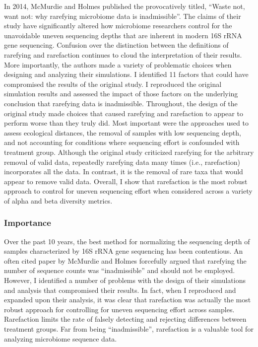 \documentclass[
]{article}
\begin{document}
In 2014, McMurdie and Holmes published the provocatively titled, ``Waste
not, want not: why rarefying microbiome data is inadmissible''. The
claims of their study have significantly altered how microbiome
researchers control for the unavoidable uneven sequencing depths that
are inherent in modern 16S rRNA gene sequencing. Confusion over the
distinction between the definitions of rarefying and rarefaction
continues to cloud the interpretation of their results. More
importantly, the authors made a variety of problematic choices when
designing and analyzing their simulations. I identified 11 factors that
could have compromised the results of the original study. I reproduced
the original simulation results and assessed the impact of those factors
on the underlying conclusion that rarefying data is inadmissible.
Throughout, the design of the original study made choices that caused
rarefying and rarefaction to appear to perform worse than they truly
did. Most important were the approaches used to assess ecological
distances, the removal of samples with low sequencing depth, and not
accounting for conditions where sequencing effort is confounded with
treatment group. Although the original study criticized rarefying for
the arbitrary removal of valid data, repeatedly rarefying data many
times (i.e., rarefaction) incorporates all the data. In contrast, it is
the removal of rare taxa that would appear to remove valid data.
Overall, I show that rarefaction is the most robust approach to control
for uneven sequencing effort when considered across a variety of alpha
and beta diversity metrics.

\hypertarget{importance}{%
\subsubsection{Importance}\label{importance}}

Over the past 10 years, the best method for normalizing the sequencing
depth of samples characterized by 16S rRNA gene sequencing has been
contentious. An often cited paper by McMurdie and Holmes forcefully
argued that rarefying the number of sequence counts was ``inadmissible''
and should not be employed. However, I identified a number of problems
with the design of their simulations and analysis that compromised their
results. In fact, when I reproduced and expanded upon their analysis, it
was clear that rarefaction was actually the most robust approach for
controlling for uneven sequencing effort across samples. Rarefaction
limits the rate of falsely detecting and rejecting differences between
treatment groups. Far from being ``inadmissible'', rarefaction is a
valuable tool for analyzing microbiome sequence data.
\end{document}
